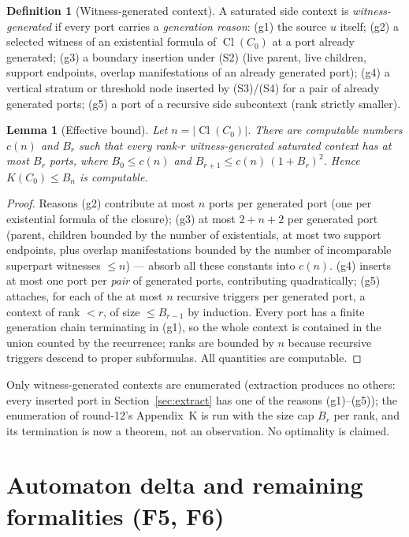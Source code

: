 \documentclass[11pt]{article}
\newtheorem{lemma}[theorem]{Lemma}
\theoremstyle{definition}
\newtheorem{definition}[theorem]{Definition}
\newcommand{\Cl}{\operatorname{Cl}}
\begin{document}
\begin{definition}[Witness-generated context]
A saturated side context is \emph{witness-generated} if every port
carries a \emph{generation reason}: (g1) the source $u$ itself; (g2) a
selected witness of an existential formula of $\Cl(C_0)$ at a port
already generated; (g3) a boundary insertion under (S2) (live parent,
live children, support endpoints, overlap manifestations of an already
generated port); (g4) a vertical stratum or threshold node inserted by
(S3)/(S4) for a pair of already generated ports; (g5) a port of a
recursive side subcontext (rank strictly smaller).
\end{definition}

\begin{lemma}[Effective bound]\label{lem:kbound}
Let $n=|\Cl(C_0)|$.  There are computable numbers $c(n)$ and $B_r$
such that every rank-$r$ witness-generated saturated context has at most
$B_r$ ports, where $B_0\le c(n)$ and
$B_{r+1}\le c(n)\,(1+B_r)^2$.  Hence
$K(C_0)\le B_n$ is computable.
\end{lemma}

\begin{proof}
Reasons (g2) contribute at most $n$ ports per generated port (one per
existential formula of the closure); (g3) at most $2+n+2$ per generated
port (parent, children bounded by the number of existentials, at most two
support endpoints, plus overlap manifestations bounded by the number of
incomparable superpart witnesses $\le n$) --- absorb all these constants
into $c(n)$.  (g4) inserts at most one port per \emph{pair} of generated
ports, contributing quadratically; (g5) attaches, for each of the at most
$n$ recursive triggers per generated port, a context of rank $<r$, of
size $\le B_{r-1}$ by induction.  Every port has a finite generation
chain terminating in (g1), so the whole context is contained in the union
counted by the recurrence; ranks are bounded by $n$ because recursive
triggers descend to proper subformulas.  All quantities are computable.
\end{proof}

Only witness-generated contexts are enumerated (extraction produces no
others: every inserted port in Section~\ref{sec:extract} has one of the
reasons (g1)--(g5)); the enumeration of round-12's Appendix~K is run with
the size cap $B_r$ per rank, and its termination is now a theorem, not an
observation.  No optimality is claimed.

\section{Automaton delta and remaining formalities (F5, F6)}
\label{sec:automaton}
\end{document}
